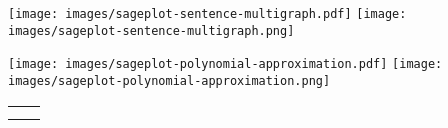 \documentclass[10pt,]{article}
\theoremstyle{plain}
\theoremstyle{definition}
\theoremstyle{definition}
\theoremstyle{definition}
\theoremstyle{definition}
\theoremstyle{definition}
\theoremstyle{definition}
\numberwithin{equation}{section}
\newlength{\panelmax}
\begin{document}
{%
\setlength{\panelmax}{0pt}
\ifdefined\panelboxAimage\else\newsavebox{\panelboxAimage}\fi%
\begin{lrbox}{\panelboxAimage}
%
{\texttt{[image: images/sageplot-sentence-multigraph.pdf]}}%
{\texttt{[image: images/sageplot-sentence-multigraph.png]}}
\end{lrbox}
\ifdefined\phAimage\else\newlength{\phAimage}\fi%
\setlength{\phAimage}{\ht\panelboxAimage+\dp\panelboxAimage}
\settototalheight{\phAimage}{\usebox{\panelboxAimage}}
\setlength{\panelmax}{\maxof{\panelmax}{\phAimage}}
\ifdefined\panelboxBimage\else\newsavebox{\panelboxBimage}\fi%
\begin{lrbox}{\panelboxBimage}
%
{\texttt{[image: images/sageplot-polynomial-approximation.pdf]}}%
{\texttt{[image: images/sageplot-polynomial-approximation.png]}}
\end{lrbox}
\ifdefined\phBimage\else\newlength{\phBimage}\fi%
\setlength{\phBimage}{\ht\panelboxBimage+\dp\panelboxBimage}
\settototalheight{\phBimage}{\usebox{\panelboxBimage}}
\setlength{\panelmax}{\maxof{\panelmax}{\phBimage}}
\leavevmode%
\setlength{\tabcolsep}{0.05\linewidth}
\par\medskip\noindent
\hspace*{0.05\linewidth}%
\begin{tabular}{@{}*{2}{c}@{}}
\begin{minipage}[c][\panelmax][t]{0.4\linewidth}\usebox{\panelboxAimage}\end{minipage}&
\begin{minipage}[c][\panelmax][t]{0.4\linewidth}\usebox{\panelboxBimage}\end{minipage}\tabularnewline
\parbox[t]{0.4\linewidth}{
}&
\parbox[t]{0.4\linewidth}{
}\end{tabular}\\
}%
\end{document}
